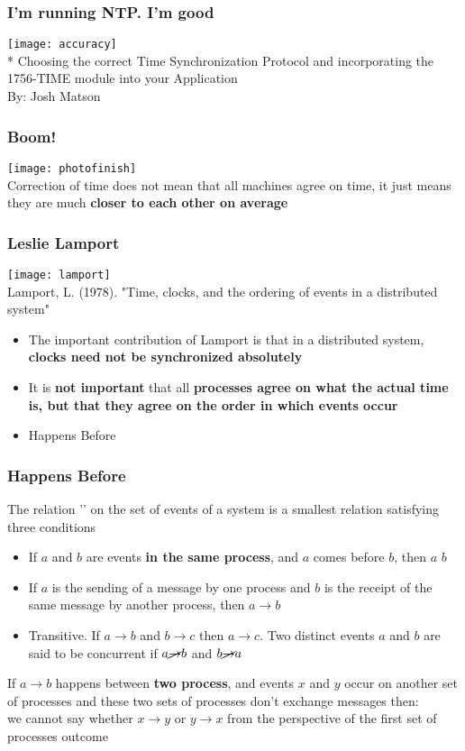 \documentclass[aspectratio=169, 15pt,usenames,dvipsnames]{beamer}
\begin{document}
	\begin{gdblank}
		\frametitle{I'm running NTP. I'm good}
		\centering
		\texttt{[image: accuracy]}
		\\\tiny
		* Choosing the correct Time Synchronization Protocol and incorporating the 1756-TIME module into your Application \\ By: Josh Matson
	\end{gdblank}
	\begin{gdblank}
		\frametitle{Boom!}
		\centering
		\texttt{[image: photofinish]}
		\large \\
		Correction of time does not mean that all machines agree on time, it just means they are much \textbf{closer to each other on average}
	\end{gdblank}
	\begin{gdblank}
		\frametitle{Leslie Lamport}
		\centering
		\texttt{[image: lamport]} \\
		\large
		Lamport, L. (1978). "Time, clocks, and the ordering of events in a distributed system"
	\end{gdblank}
	\begin{gdblank}
		\centering
		\begin{itemize}
			\item The important contribution of Lamport is that in a distributed system, \textbf{clocks need not be synchronized absolutely}
			\item It is \textbf{not important} that all \textbf{processes agree on what the actual time is, but that they agree on the order in which events occur}
			\item Happens Before
		\end{itemize}		
	\end{gdblank}
	\begin{gdblank}
		\frametitle{Happens Before}
		The relation '\rightarrow' on the set of events of a system is a smallest relation satisfying three conditions
		\begin{itemize}
			\item If $a$ and $b$ are events \textbf{in the same process}, and $a$ comes before $b$, then $a$ \rightarrow $b$ 
			\item If $a$ is the sending of a message by one process and $b$ is the receipt of the same message by another process, then $a\rightarrow b$
			\item Transitive. If $a\rightarrow b$ and $b\rightarrow c$ then $a\rightarrow c$. Two distinct events $a$ and $b$ are said to be concurrent if $a\cancel{\rightarrow} b$ and $b\cancel{\rightarrow} a$
		\end{itemize}				
		\par
		If $a\rightarrow b$ happens between \textbf{two process}, and events $x$ and $y$ occur on another set of processes and these two sets of processes don’t exchange messages then:\\
		we cannot say whether $x\rightarrow y$ or $y\rightarrow x$ from the perspective of the first set of processes
		\tiny outcome
	\end{gdblank}
\end{document}
